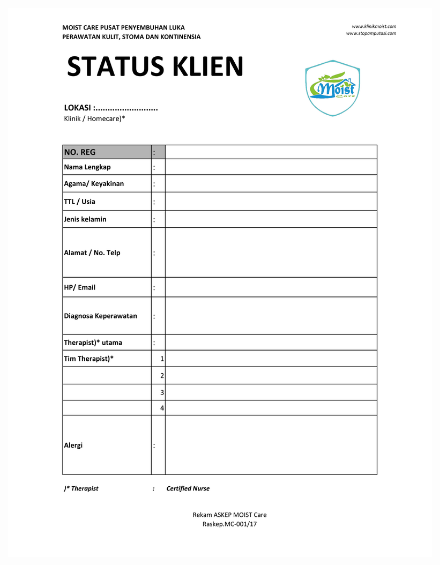 \begin{figure}[H]
	\centering
	\includegraphics[keepaspectratio, width=14cm]{gambar/Format_Pengkajian-3}
	\label{gambar:Format_Pengkajian_3}
\end{figure}

